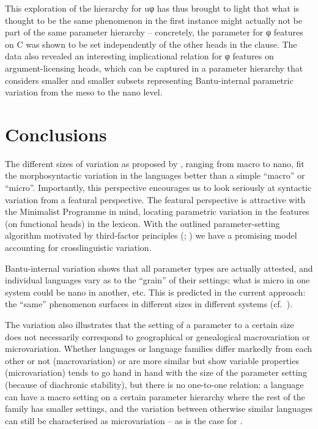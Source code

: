 \documentclass[output=paper]{langsci/langscibook}
\begin{document}
This exploration of the hierarchy for uφ  has thus brought to
light that what is thought to be the same phenomenon in the first instance
might actually not be part of the same parameter hierarchy -- concretely, the parameter for φ features on C was shown to be
set independently of the other heads in the clause. The data also revealed an
interesting implicational relation for φ features on argument-licensing heads,
which can be captured in a parameter hierarchy that
considers smaller and smaller subsets representing Bantu-internal
parametric variation from the meso to the nano level.

\section{Conclusions}\label{sec:3.4}

The different sizes of variation as proposed by \citet{BibRob2015}, ranging
from macro to nano, fit the morphosyntactic variation in the  languages
better than a simple \enquote{macro} or \enquote{micro}. Importantly, this perspective
encourages us to look seriously at syntactic variation from a featural
perspective. The featural perspective is attractive with the Minimalist
Programme in mind, locating parametric variation in the features (on functional
heads) in the lexicon. With the outlined parameter-setting algorithm motivated
by third-factor principles (\citealt{Biberauer2017,Biberauer2017c};
\citealt{BibRob2017}) we have a promising model accounting for
crosslinguistic variation.\newpage

Bantu-internal variation shows that all parameter types are actually attested,
and individual languages vary as to the “grain” of their settings: what is
micro in one system could be nano in another, etc. This is predicted in the
current approach: the “same” phenomenon surfaces in different sizes in
different systems (cf.\ \citealt{BibRob2016,Ledgeway2013}).

The  variation also illustrates that the setting of a parameter to a
certain size does not necessarily correspond to geographical or genealogical
macrovariation or microvariation. Whether languages or language families differ
markedly from each other or not (macrovariation) or are more similar but show
variable properties (microvariation) tends to go hand in hand with the size of
the parameter setting (because of diachronic stability), but there is no
one-to-one relation: a language can have a macro setting on a certain parameter
hierarchy where the rest of the family has smaller settings, and the variation
between otherwise similar languages can still be characterised as
microvariation – as is the case for .
\end{document}
